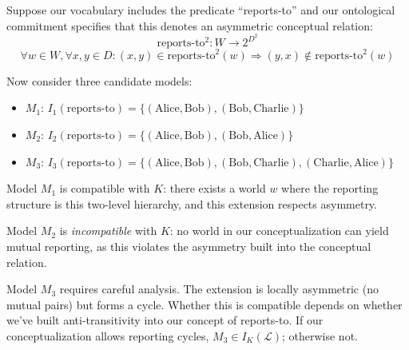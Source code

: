 \begin{example}
	Suppose our vocabulary includes the predicate ``reports-to'' and our ontological commitment specifies that this denotes an asymmetric conceptual relation:
	$$\text{reports-to}^2 : W \to 2^{D^2}$$
	$$\forall w \in W, \forall x,y \in D: (x,y) \in \text{reports-to}^2(w) \Rightarrow (y,x) \notin \text{reports-to}^2(w)$$
	
	Now consider three candidate models:
	\begin{itemize}
		\item $M_1$: $I_1(\text{reports-to}) = \{(\text{Alice}, \text{Bob}), (\text{Bob}, \text{Charlie})\}$
		\item $M_2$: $I_2(\text{reports-to}) = \{(\text{Alice}, \text{Bob}), (\text{Bob}, \text{Alice})\}$
		\item $M_3$: $I_3(\text{reports-to}) = \{(\text{Alice}, \text{Bob}), (\text{Bob}, \text{Charlie}), (\text{Charlie}, \text{Alice})\}$
	\end{itemize}
	
	Model $M_1$ is compatible with $K$: there exists a world $w$ where the reporting structure is this two-level hierarchy, and this extension respects asymmetry.
	
	Model $M_2$ is \emph{incompatible} with $K$: no world in our conceptualization can yield mutual reporting, as this violates the asymmetry built into the conceptual relation.
	
	Model $M_3$ requires careful analysis. The extension is locally asymmetric (no mutual pairs) but forms a cycle. Whether this is compatible depends on whether we've built anti-transitivity into our concept of reports-to. If our conceptualization allows reporting cycles, $M_3 \in I_K(\mathcal{L})$; otherwise not.
\end{example}